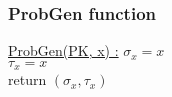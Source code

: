 \subsubsection{ProbGen function}
\underline{ProbGen(PK, x) :} 
\tabNormal $\sigma_x = x$ \\
\tabNormal $\tau_x = x$ \\
\tabNormal return $(\sigma_x, \tau_x)$  \\
